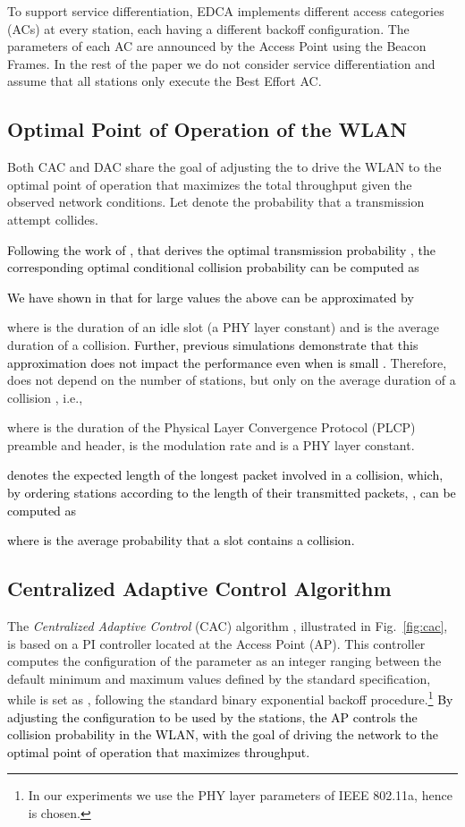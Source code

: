 \documentclass[a4paper,10pt]{article}
\newcommand{\revs}[1]{\textcolor{black}{#1}}
\begin{document}
To support service differentiation, EDCA implements different access categories (ACs) at every station, each having a different backoff configuration. The parameters of each AC are announced  by the Access Point using the Beacon Frames. In the rest of the paper we do not consider service differentiation and assume that all stations only execute the Best Effort AC. 

\subsection{Optimal Point of Operation of the WLAN}
\label{sec:optimal_point}

Both CAC and DAC share the goal of adjusting the  to drive the WLAN to the optimal point of operation that maximizes the total throughput given the observed network conditions. Let  denote the probability that a transmission attempt collides. \revs{Following the work of \cite{bianchi00}, that derives the optimal transmission probability , the corresponding optimal conditional collision probability can be computed as

We have shown in \cite{patras09monet,patras10tmc} that for large  values the above can be approximated by}

where  is the duration of an idle slot (a PHY layer constant) and  is the average duration of a collision. \revs{Further, previous simulations demonstrate that this approximation does not impact the performance even when  is small \cite{patras09monet,patras10tmc}.} Therefore,  does not depend on the number of stations, but only on the average duration of a collision , i.e., 

where  is the duration of the Physical Layer Convergence Protocol (PLCP) preamble and header,  is the modulation rate and  is a PHY layer constant. \revs{ denotes the expected length of the longest packet involved in a collision, which, by ordering stations according to the length of their transmitted packets, , can be computed as

where  is the average probability that a slot contains a collision.}


\subsection{Centralized Adaptive Control Algorithm}

The \emph{Centralized Adaptive Control} (CAC) algorithm \cite{patras09monet}, illustrated in Fig.~\ref{fig:cac}, is based on a PI controller located at the Access Point (AP). This controller computes the configuration of the  parameter as an integer ranging between the default minimum and maximum values defined by the standard specification, while  is set as , following the standard binary exponential backoff procedure.\footnote{In our experiments we use the PHY layer parameters of IEEE 802.11a, hence  is chosen.} \revs{By adjusting the   configuration to be used by the stations, the AP controls the collision probability in the WLAN, with the goal of driving the network to the optimal point of operation that maximizes throughput.}
\end{document}
